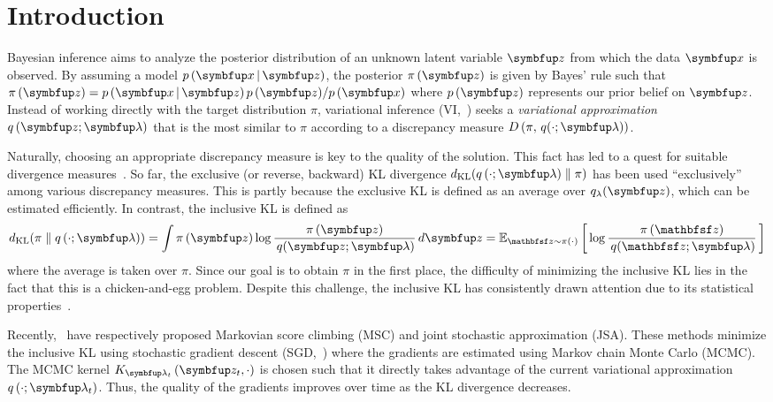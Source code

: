 
\section{Introduction}\label{section:intro}
Bayesian inference aims to analyze the posterior distribution of an unknown latent variable \(\vz\) from which the data \(\vx\) is observed.
By assuming a model \(p\,(\vx\,|\,\vz)\), the posterior \(\pi\,(\vz)\) is given by Bayes' rule such that \(\pi\,(\vz) = {p\,(\vx\,|\,\vz)\,p\,(\vz)}/{p\,(\vx)}\) where \(p\,(\vz)\) represents our prior belief on \(\vz\).
Instead of working directly with the target distribution \(\pi\), variational inference (VI,~\citealt{blei_variational_2017}) seeks a \textit{variational approximation} \(q\,(\vz; \vlambda)\) that is the most similar to \(\pi\) according to a discrepancy measure \(D\,(\pi,\, q(\cdot; \vlambda))\).

Naturally, choosing an appropriate discrepancy measure is key to the quality of the solution.
This fact has led to a quest for suitable divergence measures~\citep{pmlr-v37-salimans15, NIPS2016_7750ca35, NIPS2017_35464c84, NEURIPS2018_1cd138d0, pmlr-v97-ruiz19a}.
So far, the exclusive (or reverse, backward)  KL divergence \(\DKL{q\left(\cdot; \vlambda\right)}{\pi}\) has been used ``exclusively'' among various discrepancy measures.
This is partly because the exclusive KL is defined as an average over \(q_{\lambda}(\vz)\), which can be estimated efficiently.
In contrast, the inclusive KL is defined as
%
{%
\vspace{-0.05in}
\begin{align*}
  \DKL{\pi}{q\left(\cdot; \vlambda\right)}
  = \int \pi\,(\vz) \log \frac{\pi\left(\vz\right)}{\,q(\vz; \vlambda)} \,d\vz
  = \Esub{\rvvz \sim \pi\left(\cdot\right)}{\log \frac{\pi\left(\rvvz\right)}{\,q(\rvvz; \vlambda)} } %
\end{align*}
}%
%
where the average is taken over \(\pi\).
Since our goal is to obtain \(\pi\) in the first place, the difficulty of minimizing the inclusive KL lies in the fact that this is a chicken-and-egg problem.
Despite this challenge, the inclusive KL has consistently drawn attention due to its statistical properties~\citep{minka2005divergence, mackay_local_2001}.

Recently,~\citet{NEURIPS2020_b2070693,pmlr-v124-ou20a} have respectively proposed Markovian score climbing (MSC) and joint stochastic approximation (JSA).
These methods minimize the inclusive KL using stochastic gradient descent (SGD,~\citealt{robbins_stochastic_1951}) where the gradients are estimated using Markov chain Monte Carlo (MCMC).
The MCMC kernel \(K_{\vlambda_t}\left(\vz_t, \cdot\right)\) is chosen such that it directly takes advantage of the current variational approximation \(q\left(\cdot; \vlambda_t\right)\).
Thus, the quality of the gradients improves over time as the KL divergence decreases.

